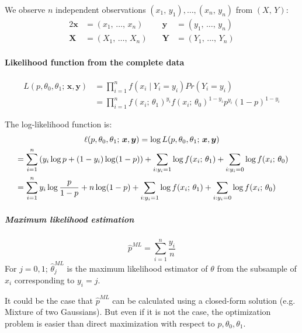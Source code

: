 We observe $n$ independent observations $(x_1,\,y_1),\dots,(x_n,\,y_n)$ from $(X,\,Y)$:
\begin{alignat*}{2}
	\boldsymbol{x} & = (x_1,\,\dots,\,x_n)       & \boldsymbol{y} & = (y_1,\,\dots,\,y_n) \\
	\boldsymbol{X} & = (X_1,\,\dots,\,X_n) \quad & \boldsymbol{Y} & = (Y_1,\,\dots,\,Y_n)
\end{alignat*}

\paragraph{Likelihood function from the complete data}
\begin{align*}
	L(p,\theta_0,\theta_1;\,\boldsymbol{x},\boldsymbol{y})
	 & = \prod_{i=1}^n f(x_i \mid Y_i = y_i) Pr(Y_i = y_i)                                       \\
	 & = \prod_{i=1}^n f(x_i;\, \theta_1)^{y_i} f(x_i;\, \theta_0)^{1-y_i} p^{y_i} (1-p)^{1-y_i}
\end{align*}

The log-likelihood function is:
\begin{align*}
	\span \ell(p,\theta_0,\theta_1;\,\boldsymbol{x},\boldsymbol{y})
	= \log L(p,\theta_0,\theta_1;\,\boldsymbol{x},\boldsymbol{y})       \\
	 & = \sum_{i=1}^n \left( y_i \log p + (1 - y_i) \log(1 - p) \right)
	+ \sum_{i:y_i=1} \log f(x_i;\,\theta_1)
	+ \sum_{i:y_i=0} \log f(x_i;\,\theta_0)                             \\
	 & = \sum_{i=1}^n y_i \log \frac{p}{1-p} + n \log (1 - p)
	+ \sum_{i:y_i=1} \log f(x_i;\,\theta_1)
	+ \sum_{i:y_i=0} \log f(x_i;\,\theta_0)
\end{align*}

\subparagraph{Maximum likelihood estimation}
\begin{equation*}
	\hat{p}^{ML} = \sum_{i=1}^n \frac{y_i}{n}
\end{equation*}
For $j = 0,1$; $\hat{\theta}_j^{ML}$ is the maximum likelihood estimator of $\theta$ from the subsample
of $x_i$ corresponding to $y_i = j$.

\begin{note}
	It could be the case that $\hat{p}^{ML}$ can be calculated using a closed-form solution
	(e.g. Mixture of two Gaussians). But even if it is not the case, the optimization
	problem is easier than direct maximization with respect to $p,\theta_0,\theta_1$.
\end{note}

